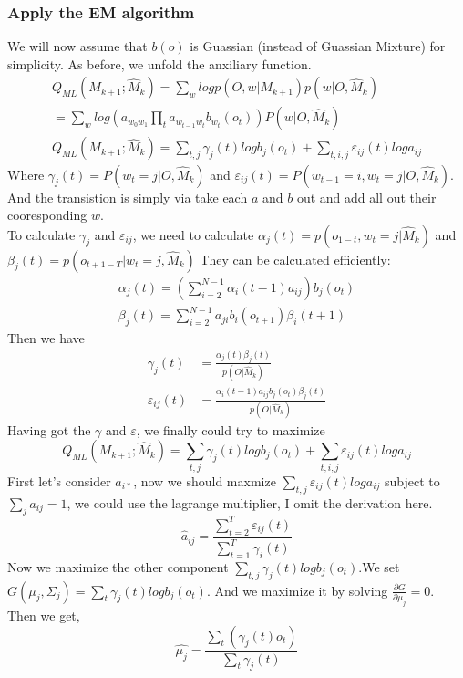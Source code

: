 \documentclass[11pt]{article}
\begin{document}
\subsubsection{Apply the EM algorithm}
We will now assume that $b(o)$ is Guassian (instead of Guassian Mixture) for simplicity.
As before, we unfold the anxiliary function.
\begin{equation}
\begin{split}
Q_{ML}(M_{k+1};\hat{M}_{k}) = \sum_w logp(O,w|M_{k+1})p(w|O,\hat{M}_k) \\
                            = \sum_w log(a_{w_0w_1}\prod_ta_{w_{t-1}w_t}b_{w_t}(o_t)) P(w|O, \hat{M}_k) \\
Q_{ML}(M_{k+1};\hat{M}_{k}) = \sum_{t,j} \gamma_j(t)logb_j(o_t)+\sum_{t,i,j}\varepsilon_{ij}(t)loga_{ij}
\end{split}                 
\end{equation}
Where $\gamma_j(t) = P(w_t=j|O,\hat{M}_k)$ and $\varepsilon_{ij}(t) = P(w_{t-1}=i,w_t=j|O,\hat{M}_k)$. And the transistion is simply via take each $a$ and $b$ out and add all out their cooresponding $w$.\\
To calculate $\gamma_j$ and $\varepsilon_{ij}$, we need to calculate $\alpha_j(t) = p(o_{1-t}, w_t=j|\hat{M}_k)$ and $\beta_j(t)=p(o_{t+1-T}|w_t=j, \hat{M}_k)$
They can be calculated efficiently:
\begin{equation}
\begin{split}
\alpha_j(t) = (\sum_{i=2}^{N-1}\alpha_i(t-1)a_{ij})b_j(o_t) \\
\beta_j(t) = \sum_{i=2}^{N-1}a_{ji}b_i(o_{t+1})\beta_i(t+1)
\end{split}
\end{equation}
Then we have
\begin{equation}
\begin{split}
\gamma_j(t) &= \frac{\alpha_j(t) \beta_j(t)}{p(O|\hat{M}_k)} \\ 
\varepsilon_{ij}(t) &= \frac{\alpha_i(t-1) a_{ij} b_j(o_t) \beta_j(t)}{p(O|\hat{M}_k)}
\end{split}
\end{equation}
Having got the $\gamma$ and $\varepsilon$, we finally could try to maximize 
\begin{equation}
Q_{ML}(M_{k+1};\hat{M}_{k}) = \sum_{t,j} \gamma_j(t)logb_j(o_t)+\sum_{t,i,j}\varepsilon_{ij}(t)loga_{ij}
\end{equation}
First let's consider $a_{i*}$, now we should maxmize $\sum_{t,j} \varepsilon_{ij}(t)loga_{ij}$ subject to $\sum_j a_{ij} = 1$, we could use the lagrange multiplier, I omit the derivation here.
\begin{equation}
\hat{a}_{ij} = \frac{\sum^{T}_{t=2}\varepsilon_{ij}(t)}{\sum^{T}_{t=1}\gamma_i(t)}
\end{equation}
Now we maximize the other component $\sum_{t,j} \gamma_j(t)logb_j(o_t)$.We set $G(\mu_j, \Sigma_j) = \sum_{t} \gamma_j(t)logb_j(o_t)$. And we maximize it by solving $\frac{\partial G}{\partial \mu_j}=0$. Then we get,
\begin{equation}
\hat{\mu_j} = \frac{\sum_t(\gamma_j(t)o_t)}{\sum_t\gamma_j(t)}
\end{equation}
\end{document}
